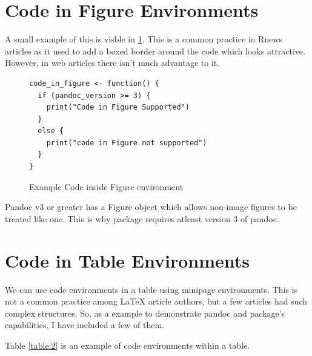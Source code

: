 \section{Code in Figure Environments}
A small example of this is visble in \ref{code:example}. This is a common practice
in Rnews articles as it used to add a boxed border around the code which looks 
attractive. However, in web articles there isn't much advantage to it. 

\begin{figure}[htbp]
\begin{center}
\begin{verbatim}
code_in_figure <- function() {
  if (pandoc_version >= 3) {
    print("Code in Figure Supported")
  }
  else {
    print("code in Figure not supported")
  }
}
\end{verbatim}
\caption{ Example Code inside Figure environment}
\label{code:example}
\end{center}
\end{figure}

Pandoc v3 or greater \citep{pandoc} has a Figure object which allows non-image
figures to be treated like one. This is why  package requires atleast version 3
of pandoc.



\section{Code in Table Environments}
We can use code environments in a table using minipage environments. This is not
a common practice among LaTeX article authors, but a few articles had such complex
structures. So, as a example to demonstrate pandoc and  package's capabilities, 
I have included a few of them.

Table \ref{table:2} is an example of code environments within a table.

